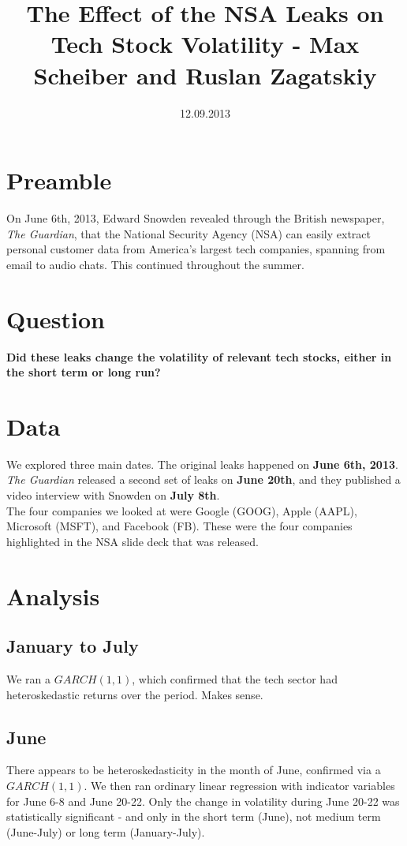 \documentclass[11pt]{amsart}
\title{The Effect of the NSA Leaks on Tech Stock Volatility - Max Scheiber and Ruslan Zagatskiy}
\date{12.09.2013}
\begin{document}
\maketitle
\section{Preamble}
On June 6th, 2013, Edward Snowden revealed through the British newspaper, \textit{The Guardian}, that the National Security Agency (NSA) can easily extract personal customer data from America's largest tech companies, spanning from email to audio chats. This continued throughout the summer.

\section{Question}
\textbf{Did these leaks change the volatility of relevant tech stocks, either in the short term or long run?}

\section{Data}
We explored three main dates. The original leaks happened on \textbf{June 6th, 2013}. \textit{The Guardian} released a second set of leaks on \textbf{June 20th}, and they published a video interview with Snowden on \textbf{July 8th}. \\

The four companies we looked at were Google (GOOG), Apple (AAPL), Microsoft (MSFT), and Facebook (FB). These were the four companies highlighted in the NSA slide deck that was released.

\section{Analysis}
\subsection{January to July}
We ran a $GARCH(1,1)$, which confirmed that the tech sector had heteroskedastic returns over the period. Makes sense.

\subsection{June}
There appears to be heteroskedasticity in the month of June, confirmed via a $GARCH(1,1)$. We then ran ordinary linear regression with indicator variables for June 6-8 and June 20-22. Only the change in volatility during June 20-22 was statistically significant - and only in the short term (June), not medium term (June-July) or long term (January-July).
\end{document}
